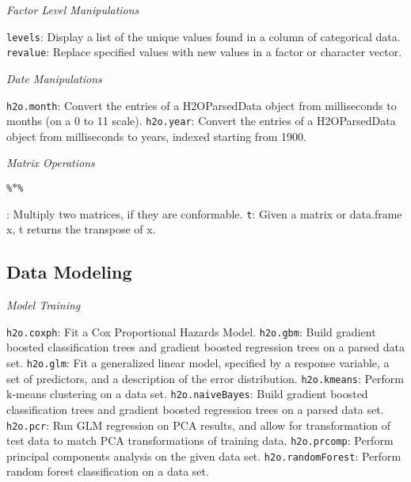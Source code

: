 \documentclass[11pt]{article}
\begin{document}
{{\emph{Factor Level Manipulations}\par
{\texttt{levels}}: Display a list of the unique values found in a column of categorical data. \newline
{\texttt{revalue}}: Replace specified values with new values in a factor or character vector.\newline

\emph{Date Manipulations}\par
{\texttt{h2o.month}}: Convert the entries of a H2OParsedData object from milliseconds to months (on a 0 to 11 scale). \newline
{\texttt{h2o.year}}: Convert the entries of a H2OParsedData object from milliseconds to years, indexed starting from 1900.\newline

\emph{Matrix Operations}\par
{\texttt{\%$*$\%}}}: Multiply two matrices, if they are conformable.\newline
{\texttt{t}}: Given a matrix or data.frame x, t returns the transpose of x.\newline

\subsection{Data Modeling}

\emph{Model Training}\par
{\texttt{h2o.coxph}}: Fit a Cox Proportional Hazards Model. \newline
{\texttt{h2o.gbm}}: Build gradient boosted classification trees and gradient boosted regression trees on a parsed data set. \newline
{\texttt{h2o.glm}}: Fit a generalized linear model, specified by a response variable, a set of predictors, and a description of the error distribution. \newline
{\texttt{h2o.kmeans}}: Perform k-means clustering on a data set. \newline
{\texttt{h2o.naiveBayes}}: Build gradient boosted classification trees and gradient boosted regression trees on a parsed data set.\newline
{\texttt{h2o.pcr}}: Run GLM regression on PCA results, and allow for transformation of test data to match PCA transformations of training data. \newline
{\texttt{h2o.prcomp}}: Perform principal components analysis on the given data set. \newline
{\texttt{h2o.randomForest}}: Perform random forest classification on a data set.\newline

}
\end{document}
